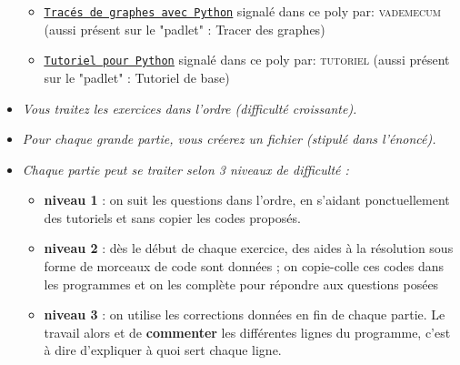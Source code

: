 \documentclass[11pt]{article}
\begin{document}
\begin{itemize}
\begin{itemize}
 \item \href{http://pedagogie.ac-limoges.fr/physique-chimie/IMG/pdf/python-trace_de_graphe.pdf}{\underline{\texttt{Tracés de graphes avec Python}}} signalé dans ce poly par: \textsc{vademecum} (aussi présent sur le "padlet" : Tracer des graphes)

 \medskip
 
 \item \href{http://pedagogie.ac-limoges.fr/physique-chimie/IMG/pdf/python-tutoriel.pdf}{\underline{\texttt{Tutoriel pour Python}}} signalé dans ce poly par: \textsc{tutoriel} (aussi présent sur le "padlet" : Tutoriel de base)
\end{itemize}







\bigskip



\item \textit{Vous traitez les exercices dans l'ordre (difficulté croissante).}




\bigskip






\item \textit{Pour chaque grande partie, vous créerez un fichier (stipulé dans l'énoncé).}







\bigskip






\item \textit{Chaque partie peut se traiter selon 3 niveaux de difficulté :} 

\medskip

\begin{itemize}
 \item \textbf{niveau 1} : on suit les questions dans l'ordre, en s'aidant ponctuellement des tutoriels et sans copier les codes proposés.

 \medskip
 \item \textbf{niveau 2} : dès le début de chaque exercice, des aides à la résolution sous forme de morceaux de code sont données ; on copie-colle ces codes dans les programmes et on les complète pour répondre aux questions posées
 
 \medskip
 \item \textbf{niveau 3} : on utilise les corrections données en fin de chaque partie. Le travail alors et de \textbf{commenter} les différentes lignes du programme, c'est à dire d'expliquer à quoi sert chaque ligne.
 

\end{itemize}
\end{itemize}
\end{document}
